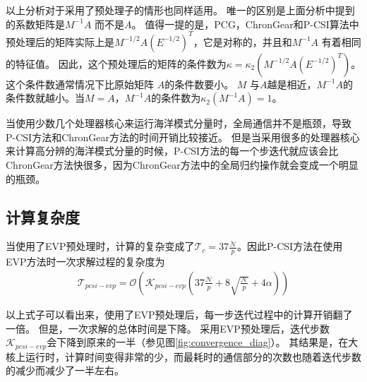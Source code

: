  
以上分析对于采用了预处理子的情形也同样适用。
唯一的区别是上面分析中提到的系数矩阵是$M^{-1}A$ 而不是$A$。
值得一提的是，PCG，ChronGear和P-CSI算法中预处理后的矩阵实际上是$M^{-1/2}A(E^{-1/2})^T$，它是对称的，并且和$M^{-1}A$ 有着相同的特征值\citep{Shewchuk1994}。
因此，这个预处理后的矩阵的条件数为$\kappa =  \kappa_2(M^{-1/2}A(E^{-1/2})^T)$。这个条件数通常情况下比原始矩阵 $A$的条件数要小。 
 $M$ 与$A$越是相近，$M^{-1}A$的条件数就越小。当$M = A$，$M^{-1}A$的条件数为$\kappa_2(M^{-1 }A ) = 1$。 

 当使用少数几个处理器核心来运行海洋模式分量时，全局通信并不是瓶颈，导致P-CSI方法和ChronGear方法的时间开销比较接近。
但是当采用很多的处理器核心来计算高分辨的海洋模式分量的时候，P-CSI方法的每一个步迭代就应该会比ChronGear方法快很多，因为ChronGear方法中的全局归约操作就会变成一个明显的瓶颈。 


\subsection{计算复杂度}  \label{subse:complex}


 
当使用了EVP预处理时，计算的复杂变成了$\mathcal{T}_c = 37 \frac{\mathcal{N}}{p}$。因此P-CSI方法在使用EVP方法时一次求解过程的复杂度为
\begin{eqnarray}
\label{t_pcsiEvp}
\mathcal{T}_{pcsi-evp}=\mathcal{O}(\mathcal{K}_{pcsi-evp} (37\frac{\mathcal{N}}{p} +8\sqrt{\frac{\mathcal{N} }{p}} + 4\alpha))
\end{eqnarray}

以上式子可以看出来，使用了EVP预处理后，每一步迭代过程中的计算开销翻了一倍。
但是，一次求解的总体时间是下降。 
采用EVP预处理后，迭代步数$\mathcal{K}_{pcsi-evp}$会下降到原来的一半（参见图\ref{fig:convergence_diag}）。
其结果是，在大核上运行时，计算时间变得非常的少，而最耗时的通信部分的次数也随着迭代步数的减少而减少了一半左右。



